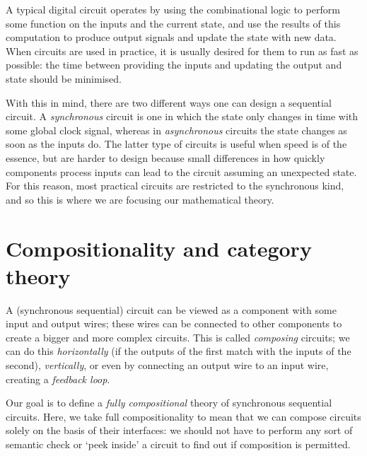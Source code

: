 A typical digital circuit operates by using the combinational logic to perform
some function on the inputs and the current state, and use the results of this
computation to produce output signals and update the state with new data.
When circuits are used in practice, it is usually desired for them to run as
fast as possible: the time between providing the inputs and updating the
output and state should be minimised.

With this in mind, there are two different ways one can design a sequential
circuit.
A \emph{synchronous} circuit is one in which the state only changes in time with
some global clock signal, whereas in \emph{asynchronous} circuits the state
changes as soon as the inputs do.
The latter type of circuits is useful when speed is of the essence, but are
harder to design because small differences in how quickly components process
inputs can lead to the circuit assuming an unexpected state.
For this reason, most practical circuits are restricted to the synchronous
kind, and so this is where we are focusing our mathematical theory.

\section{Compositionality and category theory}

A (synchronous sequential) circuit can be viewed as a component with some
input and output wires; these wires can be connected to other components to
create a bigger and more complex circuits.
This is called \emph{composing} circuits; we can do this
\emph{horizontally} (if the outputs of the first match with the inputs of the
second), \emph{vertically}, or even by connecting an output wire to an input
wire, creating a \emph{feedback loop}.

\begin{center}
    \qquad
    \qquad
\end{center}

Our goal is to define a \emph{fully compositional} theory of synchronous
sequential circuits.
Here, we take full compositionality to mean that we can compose circuits solely
on the basis of their interfaces: we should not have to perform any sort of
semantic check or `peek inside' a circuit to find out if composition is
permitted.


